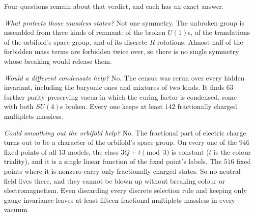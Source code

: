 Four questions remain about that verdict, and each has an exact answer.

\emph{What protects those massless states?} Not one symmetry. The unbroken group is assembled from three kinds
of remnant: of the broken $U(1)$s, of the translations of the orbifold's space group, and of its discrete
$R$-rotations. Almost half of the forbidden mass terms are forbidden twice over, so there is no single symmetry
whose breaking would release them.

\emph{Would a different condensate help?} No. The census was rerun over every hidden invariant, including the
baryonic ones and mixtures of two kinds. It finds $63$ further parity-preserving vacua in which the curing
factor is condensed, some with both $SU(4)$s broken. Every one keeps at least $142$ fractionally charged
multiplets massless.

\emph{Could smoothing out the orbifold help?} No. The fractional part of electric charge turns out to be a
character of the orbifold's space group. On every one of the $946$ fixed points of all $13$ models, the class
$3Q+t \pmod 3$ is constant ($t$ is the colour triality), and it is a single linear function of the fixed
point's labels. The $516$ fixed points where it is nonzero carry only fractionally charged states. So no
neutral field lives there, and they cannot be blown up without breaking colour or electromagnetism. Even
discarding every discrete selection rule and keeping only gauge invariance leaves at least fifteen fractional
multiplets massless in every vacuum.

